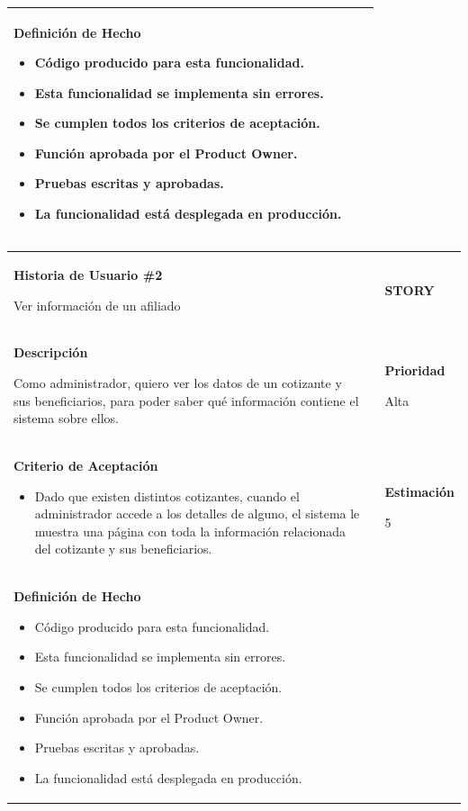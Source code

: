 \documentclass[12pt,a4paper]{article}
\begin{document}
\begin{center}
\begin{tabular}{|>{\columncolor[RGB]{215, 215, 215}} p{10cm} >{\columncolor[RGB]{215, 215, 215}} c >{\columncolor[RGB]{215, 215, 215}} p{2.5cm}|}
\textbf{Definición de Hecho}

\begin{itemize}
\item Código producido para esta funcionalidad.
\item Esta funcionalidad se implementa sin errores.
\item Se cumplen todos los criterios de aceptación.
\item Función aprobada por el Product Owner.
\item Pruebas escritas y aprobadas.
\item La funcionalidad está desplegada en producción.
\end{itemize} & & \\
\hline
\end{tabular}
\vspace{5mm}

\begin{tabular}{| p{10cm} c p{2.5cm}|}
\hline 
\textbf{Historia de Usuario \#2}

Ver información de un afiliado & & \textbf{{\Large STORY}} \\ 
\textbf{Descripción}

Como administrador, quiero ver los datos de un cotizante y sus beneficiarios, para poder saber qué información contiene el sistema sobre ellos. &  & \textbf{Prioridad}

Alta\\

\textbf{Criterio de Aceptación}

\begin{itemize}
\item Dado que existen distintos cotizantes, cuando el administrador accede a los detalles de alguno, el sistema le muestra una página con toda la información relacionada del cotizante y sus beneficiarios.
\end{itemize} & & \textbf{Estimación}

5 \\ 

\textbf{Definición de Hecho}

\begin{itemize}
\item Código producido para esta funcionalidad.
\item Esta funcionalidad se implementa sin errores.
\item Se cumplen todos los criterios de aceptación.
\item Función aprobada por el Product Owner.
\item Pruebas escritas y aprobadas.
\item La funcionalidad está desplegada en producción.
\end{itemize} & & \\
\hline 
\end{tabular}
\vspace{5mm}


\end{center}
\end{document}
